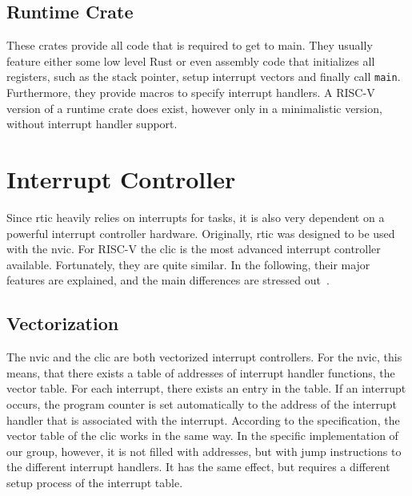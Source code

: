 \subsection{Runtime Crate}
These crates provide all code that is required to get to main. They usually feature either some low level Rust or even assembly code that initializes all registers, such as the stack pointer, setup interrupt vectors and finally call \texttt{main}. Furthermore, they provide macros to specify interrupt handlers. A RISC-V version of a runtime crate does exist, however only in a minimalistic version, without interrupt handler support.

\section{Interrupt Controller}
\label{sec:interrupt_controller}
Since \gls{rtic} heavily relies on interrupts for tasks, it is also very dependent on a powerful interrupt controller hardware.
Originally, \gls{rtic} was designed to be used with the \gls{nvic}.
For RISC-V the \gls{clic} is the most advanced interrupt controller available.
Fortunately, they are quite similar.
In the following, their major features are explained, and the main differences are stressed out~\cite{NVIC}\cite{CLIC}. 

\subsection{Vectorization}
\label{sec:vectorization}
The \gls{nvic} and the \gls{clic} are both vectorized interrupt controllers.
For the \gls{nvic}, this means, that there exists a table of addresses of interrupt handler functions, the vector table. For each interrupt, there exists an entry in the table. If an interrupt occurs, the program counter is set automatically to the address of the interrupt handler that is associated with the interrupt.
According to the specification, the vector table of the \gls{clic} works in the same way.
In the specific implementation of our group, however, it is not filled with addresses, but with jump instructions to the different interrupt handlers.
It has the same effect, but requires a different setup process of the interrupt table.~\cite{NVIC}\cite{CLIC}


